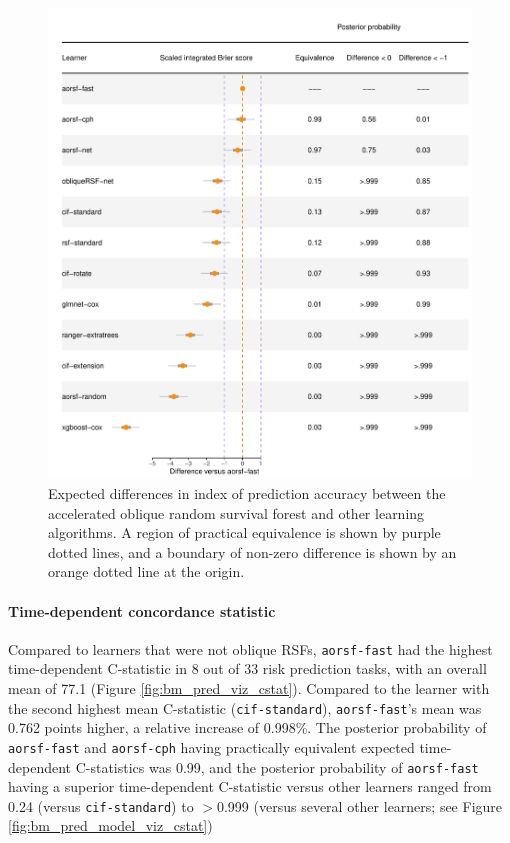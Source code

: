 \documentclass{article}\usepackage[]{graphicx}\usepackage[]{xcolor}
\makeatletter
\def\maxwidth{ %
  \ifdim\Gin@nat@width>\linewidth
    \linewidth
  \else
    \Gin@nat@width
  \fi
}
\newenvironment{knitrout}{}{} %
\makeatother
\begin{document}
\begin{knitrout}
\color{fgcolor}\begin{figure}
\includegraphics[width=\maxwidth]{figure/bm_pred_model_viz_ibs-1} \caption[Expected differences in index of prediction accuracy between the accelerated oblique random survival forest and other learning algorithms]{Expected differences in index of prediction accuracy between the accelerated oblique random survival forest and other learning algorithms. A region of practical equivalence is shown by purple dotted lines, and a boundary of non-zero difference is shown by an orange dotted line at the origin.}\label{fig:bm_pred_model_viz_ibs}
\end{figure}

\end{knitrout}

\paragraph{Time-dependent concordance statistic}




Compared to learners that were not oblique RSFs, \texttt{aorsf-fast} had the highest time-dependent C-statistic in 8 out of 33 risk prediction tasks, with an overall mean of 77.1 (Figure \ref{fig:bm_pred_viz_cstat}). Compared to the learner with the second highest mean C-statistic (\texttt{cif-standard}), \texttt{aorsf-fast}'s mean was 0.762 points higher, a relative increase of 0.998\%. The posterior probability of \texttt{aorsf-fast} and \texttt{aorsf-cph} having practically equivalent expected time-dependent C-statistics was 0.99, and the posterior probability of \texttt{aorsf-fast} having a superior time-dependent C-statistic versus other learners ranged from 0.24 (versus \texttt{cif-standard}) to $>$0.999 (versus several other learners; see Figure \ref{fig:bm_pred_model_viz_cstat})
\end{document}
